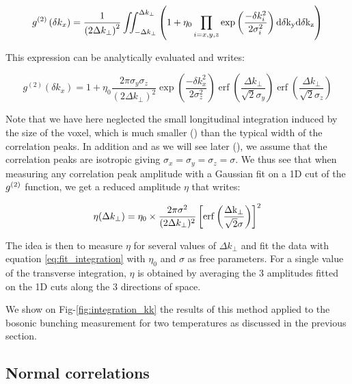 \begin{equation}
    g^{(2)} \left(\delta k_{x}\right)=\frac{1}{\left(2 \Delta k_{\perp}\right)^{2}} \iint_{-\Delta k_{\perp}}^{\Delta k_{\perp}} \left( 1+ \eta_0 \prod_{i=x, y, z} \exp \left(\frac{-\delta k_{i}^{2}}{2 \sigma_i^{2}}\right) \rm{d} \delta k_y \rm{d} \delta k_z \right)
\end{equation}

This expression can be analytically evaluated and writes:

\begin{equation}
    g^{(2)} \left(\delta k_{x}\right)=1+\eta_0 \frac{2 \pi \sigma_y \sigma_z}{\left(2 \Delta k_{\perp}\right)^{2}} \exp \left(\frac{-\delta k_{x}^{2}}{2 \sigma_{z}^{2}}\right) \operatorname{erf}\left(\frac{\Delta k_{\perp}}{\sqrt{2} \sigma_{y}}\right) \operatorname{erf}\left(\frac{\Delta k_{\perp}}{\sqrt{2} \sigma_{z}}\right)
\end{equation}

Note that we have here neglected the small longitudinal integration induced by the size of the voxel, which is much smaller () than the typical width of the correlation peaks. In addition and as we will see later (), we assume that the correlation peaks are isotropic giving $\sigma_x=\sigma_y=\sigma_z=\sigma$. We thus see that when measuring any correlation peak amplitude with a Gaussian fit on a 1D cut of the $g^{(2)}$ function, we get a reduced amplitude $\eta$ that writes:

\begin{equation}
    \eta (\Delta k_{\perp})= \eta_{0} \times \frac{2 \pi \sigma^2}{(2\Delta k_{\perp})^2}\left[\rm{erf} \left(\frac{\Delta k_{\perp}}{\sqrt{2}\sigma} \right)\right]^2
    \label{eq:fit_integration}
\end{equation}

The idea is then to measure $\eta$ for several values of $\Delta k_{\perp}$ and fit the data with equation \ref{eq:fit_integration} with $\eta_0$ and $\sigma$ as free parameters. For a single value of the transverse integration, $\eta$ is obtained by averaging the 3 amplitudes fitted on the 1D cuts along the 3 directions of space.


 We show on Fig-\ref{fig:integration_kk} the results of this method applied to the bosonic bunching measurement for two temperatures as discussed in the previous section. 

\subsection{Normal correlations}

